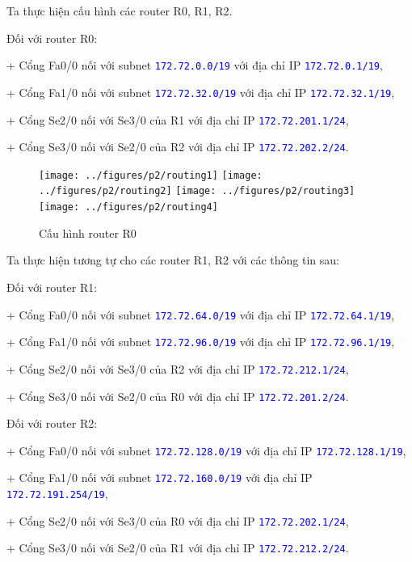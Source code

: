 \begin{enumerate}
\begin{enumerate}
Ta thực hiện cấu hình các router R0, R1, R2.

Đối với router R0: 

+ Cổng Fa0/0 nối với subnet \texttt{\textcolor{blue}{172.72.0.0/19}} với địa chỉ IP \texttt{\textcolor{blue}{172.72.0.1/19}}, 

+ Cổng Fa1/0 nối với subnet \texttt{\textcolor{blue}{172.72.32.0/19}} với địa chỉ IP \texttt{\textcolor{blue}{172.72.32.1/19}}, 

+ Cổng Se2/0 nối với Se3/0 của R1 với địa chỉ IP \texttt{\textcolor{blue}{172.72.201.1/24}}, 

+ Cổng Se3/0 nối với Se2/0 của R2 với địa chỉ IP \texttt{\textcolor{blue}{172.72.202.2/24}}.

\begin{figure}[H]
\begin{center}
\texttt{[image: ../figures/p2/routing1]}
\texttt{[image: ../figures/p2/routing2]}
\texttt{[image: ../figures/p2/routing3]}
\texttt{[image: ../figures/p2/routing4]}
\end{center}
\caption{Cấu hình router R0}
\end{figure}

Ta thực hiện tương tự cho các router R1, R2 với các thông tin sau:

Đối với router R1: 

+ Cổng Fa0/0 nối với subnet \texttt{\textcolor{blue}{172.72.64.0/19}} với địa chỉ IP \texttt{\textcolor{blue}{172.72.64.1/19}}, 

+ Cổng Fa1/0 nối với subnet \texttt{\textcolor{blue}{172.72.96.0/19}} với địa chỉ IP \texttt{\textcolor{blue}{172.72.96.1/19}}, 

+ Cổng Se2/0 nối với Se3/0 của R2 với địa chỉ IP \texttt{\textcolor{blue}{172.72.212.1/24}}, 

+ Cổng Se3/0 nối với Se2/0 của R0 với địa chỉ IP \texttt{\textcolor{blue}{172.72.201.2/24}}.

Đối với router R2: 

+ Cổng Fa0/0 nối với subnet \texttt{\textcolor{blue}{172.72.128.0/19}} với địa chỉ IP \texttt{\textcolor{blue}{172.72.128.1/19}}, 

+ Cổng Fa1/0 nối với subnet \texttt{\textcolor{blue}{172.72.160.0/19}} với địa chỉ IP \texttt{\textcolor{blue}{172.72.191.254/19}}, 

+ Cổng Se2/0 nối với Se3/0 của R0 với địa chỉ IP \texttt{\textcolor{blue}{172.72.202.1/24}}, 

+ Cổng Se3/0 nối với Se2/0 của R1 với địa chỉ IP \texttt{\textcolor{blue}{172.72.212.2/24}}.


\end{enumerate}
\end{enumerate}
